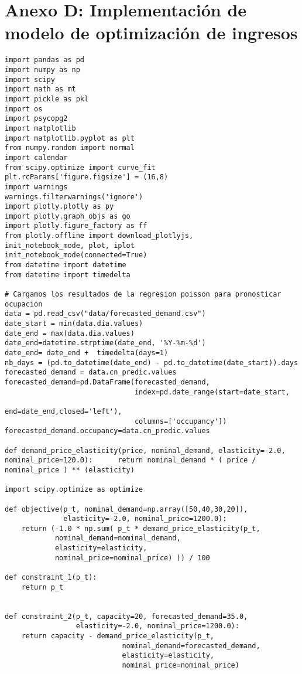\chapter{Anexo D: Implementación de modelo de optimización de ingresos}
\label{ch:anexod}

\begin{verbatim}
import pandas as pd
import numpy as np
import scipy
import math as mt
import pickle as pkl
import os
import psycopg2
import matplotlib
import matplotlib.pyplot as plt
from numpy.random import normal
import calendar
from scipy.optimize import curve_fit
plt.rcParams['figure.figsize'] = (16,8)
import warnings
warnings.filterwarnings('ignore')
import plotly.plotly as py
import plotly.graph_objs as go
import plotly.figure_factory as ff
from plotly.offline import download_plotlyjs, 
init_notebook_mode, plot, iplot
init_notebook_mode(connected=True)
from datetime import datetime
from datetime import timedelta

# Cargamos los resultados de la regresion poisson para pronosticar ocupacion
data = pd.read_csv("data/forecasted_demand.csv")
date_start = min(data.dia.values)
date_end = max(data.dia.values)
date_end=datetime.strptime(date_end, '%Y-%m-%d')
date_end= date_end +  timedelta(days=1)
nb_days = (pd.to_datetime(date_end) - pd.to_datetime(date_start)).days
forecasted_demand = data.cn_predic.values
forecasted_demand=pd.DataFrame(forecasted_demand,
                               index=pd.date_range(start=date_start,
                                                   end=date_end,closed='left'),
                               columns=['occupancy'])
forecasted_demand.occupancy=data.cn_predic.values

def demand_price_elasticity(price, nominal_demand, elasticity=-2.0, nominal_price=120.0):      return nominal_demand * ( price / nominal_price ) ** (elasticity)

import scipy.optimize as optimize

def objective(p_t, nominal_demand=np.array([50,40,30,20]),
              elasticity=-2.0, nominal_price=1200.0):
    return (-1.0 * np.sum( p_t * demand_price_elasticity(p_t, 
            nominal_demand=nominal_demand,
            elasticity=elasticity,
            nominal_price=nominal_price) )) / 100

def constraint_1(p_t):
    return p_t


def constraint_2(p_t, capacity=20, forecasted_demand=35.0,
                 elasticity=-2.0, nominal_price=1200.0):
    return capacity - demand_price_elasticity(p_t, 
                            nominal_demand=forecasted_demand,
                            elasticity=elasticity,
                            nominal_price=nominal_price)


\end{verbatim}
